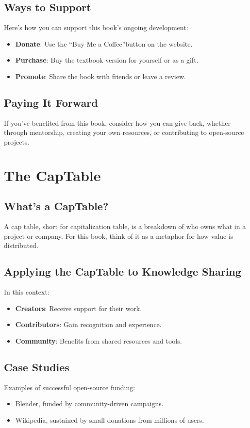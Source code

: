 \subsection{Ways to Support}
Here\textquoteright s how you can support this book\textquoteright s ongoing development:
\begin{itemize}
\item \textbf{Donate}: Use the \textquotedblleft Buy Me a Coffee\textquotedblright  button on the website.
\item \textbf{Purchase}: Buy the textbook version for yourself or as a gift.
\item \textbf{Promote}: Share the book with friends or leave a review.
\end{itemize}

\subsection{Paying It Forward}
If you\textquoteright ve benefited from this book, consider how you can give back, whether through mentorship, creating your own resources, or contributing to open-source projects.

\section{The CapTable}
\subsection{What\textquoteright s a CapTable?}
A cap table, short for capitalization table, is a breakdown of who owns what in a project or company. For this book, think of it as a metaphor for how value is distributed.

\subsection{Applying the CapTable to Knowledge Sharing}
In this context:
\begin{itemize}
\item \textbf{Creators}: Receive support for their work.
\item \textbf{Contributors}: Gain recognition and experience.
\item \textbf{Community}: Benefits from shared resources and tools.
\end{itemize}

\subsection{Case Studies}
Examples of successful open-source funding:
\begin{itemize}
\item Blender, funded by community-driven campaigns.
\item Wikipedia, sustained by small donations from millions of users.
\end{itemize}

